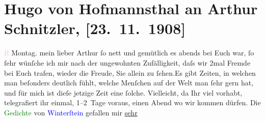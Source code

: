 

               \section[Hugo von Hofmannsthal an Arthur Schnitzler, {[}23. 11. 1908{]}]{ Hugo von Hofmannsthal an Arthur Schnitzler, {[}23. 11. 1908{]}}\nopagebreak{}\rehead{ }\normalsize\beginnumbering{} \toendnotes[C]{\smallbreak\pagebreak[2]} 
\toendnotes[C]{\smallbreak}\pstart
           \raggedleft{}{\pb}\textcolor{pink}{R.}{}\ledrightnote{\textcolor{pink}{Rodaun}}{\\}Montag.\pend
           \pstart{}mein lieber Arthur\pend\pstart
           ſo nett und gemütlich es \label{K_L01808_1v}\label{K_L01808_1h} abends bei Euch war, ſo ſehr wünſche ich mir nach der ungewohnten
               Zufälligkeit, daſs wir \introOben{}2mal\introOben{} Fremde bei Euch trafen, wieder
               die Freude, Sie allein zu ſehen.\hspace*{1.5em}Es gibt Zeiten, in
               welchen man beſonders deutlich fühlt, welche Menſchen {\pb}auf der Welt man ſehr gern hat,
               und für mich ist dieſe jetzige Zeit eine ſolche.\pend
           \pstart
           Vielleicht, da Ihr viel vorhabt, telegrafiert ihr einmal, 1–2 Tage voraus, einen
               Abend wo wir kommen dürfen.\pend
           \pstart
           Die \textcolor{green}{Gedichte}{} von \textcolor{blue}{Winterſtein}{}\ledrightnote{\textcolor{blue}{Alfred von Winterstein}} gefallen mir \uline{sehr}
